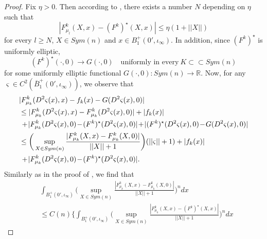 \documentclass[11pt, reqno]{amsart}
\numberwithin{equation}{section}
\begin{document}
\begin{proof}
Fix $\eta >0$. Then according to \cite[Lemma 4.1]{MR3539473}, there exists a number $N$ depending on $\eta$ such that
$$ |F_{\mu_{l}}^{k}(X,x)-(F^{k})^{\star}(X,x)| \le \eta (1+ ||X||)$$
for every $l \ge N$, $X \in Sym(n)$ and $x \in B_{1}^{+}(0',\iota_{\infty})$.
In addition, since $(F^{k})^{\star}$ is uniformly elliptic,
$$ (F^{k})^{\star}(\cdot,0) \to G(\cdot,0) \quad \textrm{uniformly in every} \ K \subset \subset Sym(n)$$
for some uniformly elliptic functional $G(\cdot,0):Sym(n) \to \mathbb{R}$.
Now, for any $\varsigma \in C^{2}(\overline{B}_{1}^{+}(0',\iota_{\infty})) $,
we observe that
\begin{align} \label{addaf} \begin{split}
&|F_{\mu_{k}}^{k}(D^{2}\varsigma(x),x)-f_{k}(x)-G(D^{2}\varsigma(x),0)|
\\ & \le |F_{\mu_{k}}^{k}(D^{2}\varsigma(x),x)-F_{\mu_{k}}^{k}(D^{2}\varsigma(x),0)|+|f_{k}(x)|
\\& \ \hspace{-0.15em}+\hspace{-0.15em} | F_{\mu_{k}}^{k}(D^{2}\varsigma(x),0)\hspace{-0.15em}-\hspace{-0.15em}(F^{k})^{\star}(D^{2}\varsigma(x),0)|
\hspace{-0.15em}+\hspace{-0.15em}|(F^{k})^{\star}(D^{2}\varsigma(x),0)\hspace{-0.15em}- \hspace{-0.15em}G(D^{2}\varsigma(x),0)|
\\ & \le \bigg( \sup_{X \in Sym(n)} \frac{|F_{\mu_{k}}^{k}(X,x)-F_{\mu_{k}}^{k}(X,0)|}{||X||+1} \bigg)(||\varsigma||+1)+|f_{k}(x)|
\\& \ \hspace{-0.15em}+\hspace{-0.15em} | F_{\mu_{k}}^{k}(D^{2}\varsigma(x),0)\hspace{-0.15em}-\hspace{-0.15em}(F^{k})^{\star}(D^{2}\varsigma(x),0)|.
\end{split}
\end{align}
Similarly as in the proof of \cite[Lemma 3.1]{MR3957152}, we find that
\begin{align*}
&\int_{B_{1}^{+}(0',\iota_{\infty})} \bigg( \sup_{X \in Sym(n)}
\frac{|F_{\mu_{k}}^{k}(X,x)-F_{\mu_{k}}^{k}(X,0)|}{||X||+1} \bigg)^{n} dx \\ &
 \le C(n)\bigg\{\int_{B_{1}^{+}(0',\iota_{\infty})} \bigg( \sup_{X \in Sym(n)}
\frac{|F_{\mu_{k}}^{k}(X,x)-(F^{k})^{\star}(X,x)|}{||X||+1} \bigg)^{n} dx

\end{align*}
\end{proof}
\end{document}
